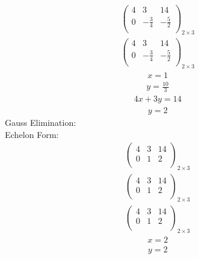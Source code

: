 \documentclass{article}
\begin{document}
\begin{align*}
\left(
\begin{array}{cc|c}
4 & 3 & 14\\
0 & -\frac{3}{4} & -\frac{5}{2}\\
\end{array}
\right)_{2\times 3}
\end{align*}
\begin{align*}
\left(
\begin{array}{cc|c}
4 & 3 & 14\\
0 & -\frac{3}{4} & -\frac{5}{2}\\
\end{array}
\right)_{2\times 3}
\end{align*}
\begin{align*}
x=1\end{align*}
\begin{align*}
y=\frac{10}{3}\end{align*}
\begin{align*}
4x + 3y=14\end{align*}
\begin{align*}
y=2\end{align*}
Gauss Elimination:\\
Echelon Form:\\
\begin{align*}
\left(
\begin{array}{cc|c}
4 & 3 & 14\\
0 & 1 & 2\\
\end{array}
\right)_{2\times 3}
\end{align*}
\begin{align*}
\left(
\begin{array}{cc|c}
4 & 3 & 14\\
0 & 1 & 2\\
\end{array}
\right)_{2\times 3}
\end{align*}
\begin{align*}
\left(
\begin{array}{cc|c}
4 & 3 & 14\\
0 & 1 & 2\\
\end{array}
\right)_{2\times 3}
\end{align*}
\begin{align*}
x=2\end{align*}
\begin{align*}
y=2\end{align*}
\end{document}
